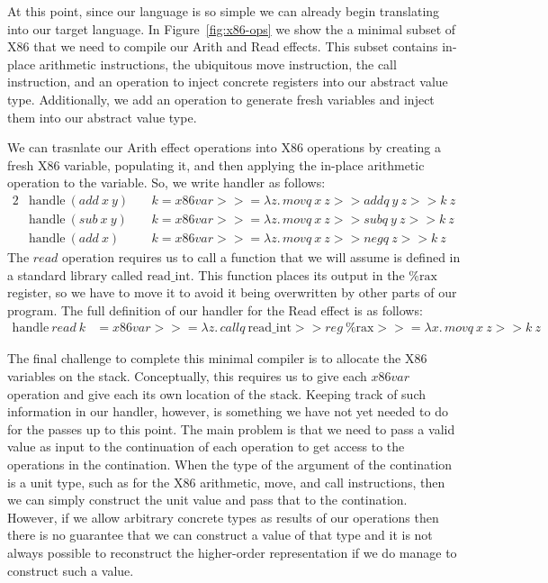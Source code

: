 \documentclass[a4paper,UKenglish,cleveref, autoref, thm-restate, anonymous]{oasics-v2021}
\newcommand\bind[1]{>\!\!>\!\!= \lambda #1.\,}
\newcommand\then{>\!\!>}
\begin{document}
At this point, since our language is so simple we can already begin translating into our target language.
In Figure~\ref{fig:x86-ops} we show the a minimal subset of X86 that we need to compile our Arith and Read effects.
This subset contains in-place arithmetic instructions, the ubiquitous move instruction, the call instruction, and an operation to inject concrete registers into our abstract value type.
Additionally, we add an operation to generate fresh variables and inject them into our abstract value type.

We can trasnlate our Arith effect operations into X86 operations by creating a fresh X86 variable, populating it, and then applying the in-place arithmetic operation to the variable.
So, we write handler as follows:
\begin{alignat*}{2}
  & \mathrm{handle}~(\mathit{add}~x~y) &&~k = x86var \bind{z} \mathit{movq}~x~z \then \mathit{addq}~y~z \then k~z \\
  & \mathrm{handle}~(\mathit{sub}~x~y) &&~k = x86var \bind{z} \mathit{movq}~x~z \then \mathit{subq}~y~z \then k~z \\
  & \mathrm{handle}~(\mathit{add}~x) &&~k = x86var \bind{z} \mathit{movq}~x~z \then \mathit{negq}~z \then k~z
\end{alignat*}
The $\mathit{read}$ operation requires us to call a function that we will assume is defined in a standard library called $\mathrm{read\_int}$. This function places its output in the $\mathrm{\%rax}$ register, so we have to move it to avoid it being overwritten by other parts of our program.
The full definition of our handler for the Read effect is as follows:
\begin{align*}
  \mathrm{handle}~\mathit{read}~k & = x86var \bind{z} \mathit{callq}~\mathrm{read\_int} \then \mathit{reg}~\mathrm{\%rax} \bind{x} \mathit{movq}~x~z \then k~z
\end{align*}

The final challenge to complete this minimal compiler is to allocate the X86 variables on the stack.
Conceptually, this requires us to give each $\mathit{x86var}$ operation and give each its own location of the stack.
Keeping track of such information in our handler, however, is something we have not yet needed to do for the passes up to this point.
The main problem is that we need to pass a valid value as input to the continuation of each operation to get access to the operations in the contination.
When the type of the argument of the contination is a unit type, such as for the X86 arithmetic, move, and call instructions, then we can simply construct the unit value and pass that to the contination.
However, if we allow arbitrary concrete types as results of our operations then there is no guarantee that we can construct a value of that type and it is not always possible to reconstruct the higher-order representation if we do manage to construct such a value.
\end{document}
